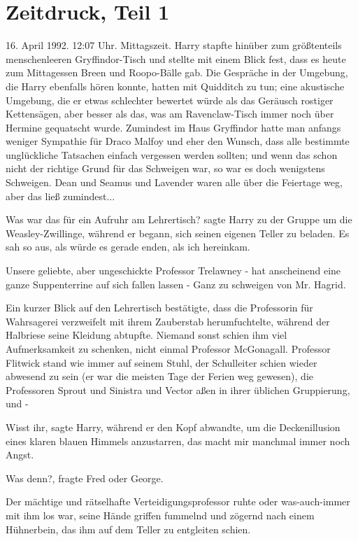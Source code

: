 \chapter{Zeitdruck, Teil 1}

16. April 1992. 12:07 Uhr. Mittagszeit. Harry stapfte hinüber zum größtenteils
menschenleeren Gryffindor-Tisch und stellte mit einem Blick fest, dass es heute
zum Mittagessen Breen und Roopo-Bälle gab. Die Gespräche in der Umgebung, die
Harry ebenfalls hören konnte, hatten mit Quidditch zu tun; eine akustische
Umgebung, die er etwas schlechter bewertet würde als das Geräusch rostiger
Kettensägen, aber besser als das, was am Ravenclaw-Tisch immer noch über Hermine
gequatscht wurde. Zumindest im Haus Gryffindor hatte man anfangs weniger
Sympathie für Draco Malfoy und eher den Wunsch, dass alle bestimmte unglückliche
Tatsachen einfach vergessen werden sollten; und wenn das schon nicht der
richtige Grund für das Schweigen war, so war es doch wenigstens Schweigen. Dean
und Seamus und Lavender waren alle über die Feiertage weg, aber das ließ
zumindest...

\glqq Was war das für ein Aufruhr am Lehrertisch?\grqq{} sagte Harry zu der
Gruppe um die Weasley-Zwillinge, während er begann, sich seinen eigenen Teller
zu beladen. \glqq Es sah so aus, als würde es gerade enden, als ich
hereinkam.\grqq{}

\glqq Unsere geliebte, aber ungeschickte Professor Trelawney -\grqq{} \glqq hat
anscheinend eine ganze Suppenterrine auf sich fallen lassen -\grqq{} \glqq Ganz
zu schweigen von Mr. Hagrid.\grqq{}

Ein kurzer Blick auf den Lehrertisch bestätigte, dass die Professorin für
Wahrsagerei verzweifelt mit ihrem Zauberstab herumfuchtelte, während der
Halbriese seine Kleidung abtupfte. Niemand sonst schien ihm viel Aufmerksamkeit
zu schenken, nicht einmal Professor McGonagall. Professor Flitwick stand wie
immer auf seinem Stuhl, der Schulleiter schien wieder abwesend zu sein (er war
die meisten Tage der Ferien weg gewesen), die Professoren Sprout und Sinistra
und Vector aßen in ihrer üblichen Gruppierung, und -

\glqq Wisst ihr\grqq{}, sagte Harry, während er den Kopf abwandte, um die
Deckenillusion eines klaren blauen Himmels anzustarren, \glqq das macht mir
manchmal immer noch Angst.\grqq{}

\glqq Was denn?\grqq{}, fragte Fred oder George.

Der mächtige und rätselhafte Verteidigungsprofessor \glqq ruhte\grqq{} oder
was-auch-immer mit ihm los war, seine Hände griffen fummelnd und zögernd nach
einem Hühnerbein, das ihm auf dem Teller zu entgleiten schien.

